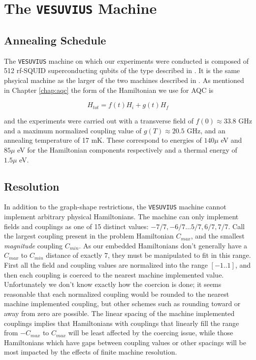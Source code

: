 \chapter{The \texttt{VESUVIUS} Machine}
\label{chap:machine}

\section{Annealing Schedule}
The \texttt{VESUVIUS} machine on which our experiments were conducted is composed of 512 rf-SQUID superconducting qubits of the type described in \cite{qubit} \cite{dwave_nature}. It is the same phsyical machine as the larger of the two machines described in \cite{pudenz}.
As mentioned in Chapter \ref{chap:aqc} the form of the Hamiltonian we use for AQC is

\begin{displaymath}
	H_{tot} = f(t)H_i + g(t)H_f
\end{displaymath}

and the experiments were carried out with a transverse field of $f(0) \approx 33.8 $ GHz and a maximum normalized coupling value of $g(T) \approx 20.5$ GHz, and an annealing temperature of 17 mK.  These correspond to energies of $140 \mu$ eV and $85 \mu$ eV for the Hamiltonian components respectively and a thermal energy of $1.5 \mu$ eV.

\section{Resolution}
In addition to the graph-shape restrictions, the \texttt{VESUVIUS} machine cannot implement arbitrary physical Hamiltonians.  The machine can only implement fields and couplings as one of 15 distinct values: $-7/7, -6/7 \dots 5/7,6/7, 7/7$.  Call the largest coupling present in the problem Hamiltonian $C_{max}$, and the smallest \emph{magnitude} coupling $C_{min}$.  As our embedded Hamiltonians don't generally have a $C_{max}$ to $C_{min}$ distance of exactly 7, they must be manipulated to fit in this range.
First  all the field and coupling values are normalized into the range $[-1..1]$, and then each coupling is coerced to the nearest machine implemented value.
Unfortunately we don't know exactly how the coercion is done; it seems reasonable that each normalized coupling would be rounded to the nearest machine implemented coupling, but other schemes such as rounding toward or away from zero are possible.
The linear spacing of the machine implemented couplings implies that Hamiltonians with couplings that linearly fill the range from $-C_{max}$ to $C_{max}$ will be least affected by the coercing issue, while those Hamiltonians which have gaps between coupling values or other spacings will be most impacted by the effects of finite machine resolution.

